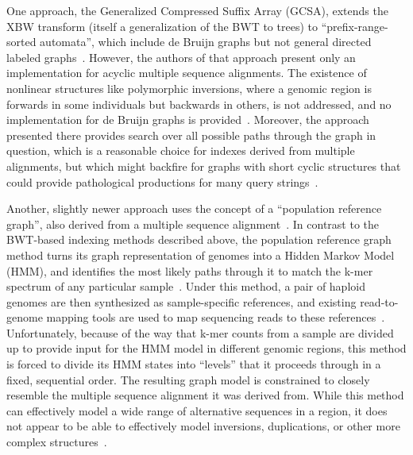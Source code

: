 One approach, the Generalized Compressed Suffix Array (GCSA), extends the XBW transform (itself a generalization of the BWT to trees) to ``prefix-range-sorted automata'', which include de Bruijn graphs but not general directed labeled graphs~\cite{siren2014indexing}. However, the authors of that approach present only an implementation for acyclic multiple sequence alignments. The existence of nonlinear structures like polymorphic inversions, where a genomic region is forwards in some individuals but backwards in others, is not addressed, and no implementation for de Bruijn graphs is provided~\cite{siren2014indexing}. Moreover, the approach presented there provides search over all possible paths through the graph in question, which is a reasonable choice for indexes derived from multiple alignments, but which might backfire for graphs with short cyclic structures that could provide pathological productions for many query strings~\cite{siren2014indexing}.

Another, slightly newer approach uses the concept of a ``population reference graph'', also derived from a multiple sequence alignment~\cite{dilthey2015improved}. In contrast to the BWT-based indexing methods described above, the population reference graph method turns its graph representation of genomes into a Hidden Markov Model (HMM), and identifies the most likely paths through it to match the k-mer spectrum of any particular sample~\cite{dilthey2015improved}. Under this method, a pair of haploid genomes are then synthesized as sample-specific references, and existing read-to-genome mapping tools are used to map sequencing reads to these references~\cite{dilthey2015improved}. Unfortunately, because of the way that k-mer counts from a sample are divided up to provide input for the HMM model in different genomic regions, this method is forced to divide its HMM states into ``levels'' that it proceeds through in a fixed, sequential order. The resulting graph model is constrained to closely resemble the multiple sequence alignment it was derived from. While this method can effectively model a wide range of alternative sequences in a region, it does not appear to be able to effectively model inversions, duplications, or other more complex structures~\cite{dilthey2015improved}.

